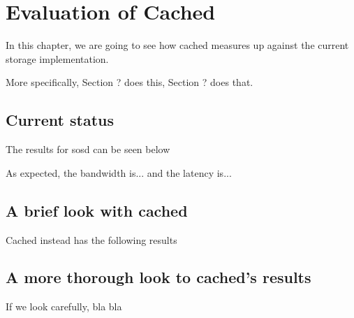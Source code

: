 \chapter{Evaluation of Cached}\label{ch:cached-evaluation}

In this chapter, we are going to see how cached measures up against the current 
storage implementation. 

More specifically, Section ? does this, Section ? does that.

\section{Current status}

The results for sosd can be seen below

As expected, the bandwidth is... and the latency is...

\section{A brief look with cached}

Cached instead has  the following results

\section{A more thorough look to cached's results}

If we look carefully, bla bla


